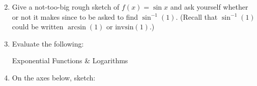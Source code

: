 \documentclass[11pt,fleqn]{article}
\begin{document}
\begin{enumerate}
\begin{multicols}{3}
\begin{enumerate}
	\end{enumerate}
	\end{multicols}
	\vfill
\newpage
\item Give a not-too-big rough sketch of $f(x)=\sin x$ and ask yourself whether or not it makes since to be asked to find $\sin^{-1}(1)$. (Recall that $\sin^{-1}(1)$ could be written $\arcsin(1)$ or $\text{invsin}(1).$)\\

\vfill


\item Evaluate the following:

	\begin{enumerate}
	\begin{multicols}{2}
	\item $\arcsin(1)$
	\item $\arccos(-\sqrt{3}/2)$
	\end{multicols}
	\vspace{1in}
	\vspace{1in}
	\end{enumerate}

\newpage
\begin{center} Exponential Functions \& Logarithms \end{center}

\item On the axes below, sketch:
\begin{enumerate}
\end{enumerate}



\end{enumerate}
\end{document}

